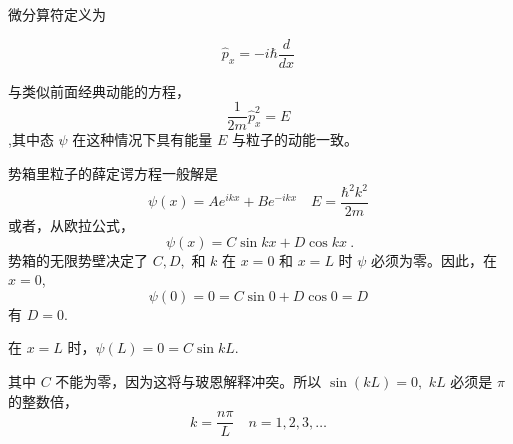 微分算符定义为

\begin{equation}
\hat{p}_x = -i\hbar \frac{d}{dx}~
\end{equation}

与类似前面经典动能的方程，
$$\frac{1}{2m}\hat{p}_x^2 = E~$$,其中态 $\psi$ 在这种情况下具有能量 $E$ 与粒子的动能一致。

势箱里粒子的薛定谔方程一般解是
\begin{equation}
\psi(x) = Ae^{ikx} + Be^{-ikx} \quad E = \frac{\hbar^2 k^2}{2m}~
\end{equation}
或者，从欧拉公式，
\begin{equation}
\psi(x) = C \sin kx + D \cos kx~.
\end{equation}
势箱的无限势壁决定了 $C, D,$ 和 $k$ 在 $x = 0$ 和 $x = L$ 时 $\psi$ 必须为零。因此，在 $x = 0$,
\begin{equation}
\psi(0) = 0 = C \sin 0 + D \cos 0 = D~
\end{equation}
有 $D = 0.$

在 $x = L$ 时，$\psi(L) = 0 = C \sin kL.$

其中 $C$ 不能为零，因为这将与玻恩解释冲突。所以 $\sin(kL) = 0,$ $kL$ 必须是 $\pi$ 的整数倍，
\begin{equation}
k = \frac{n\pi}{L} \quad n = 1,2,3,\ldots~
\end{equation}












